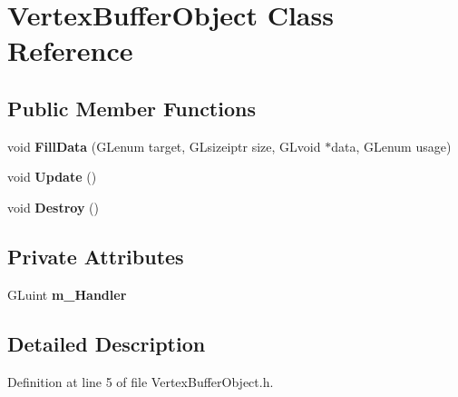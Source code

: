 \hypertarget{class_vertex_buffer_object}{}\section{Vertex\+Buffer\+Object Class Reference}
\label{class_vertex_buffer_object}
\subsection*{Public Member Functions}
\begin{DoxyCompactItemize}
\item 
void {\bfseries Fill\+Data} (G\+Lenum target, G\+Lsizeiptr size, G\+Lvoid $\ast$data, G\+Lenum usage)\hypertarget{class_vertex_buffer_object_a66d5483cb22e5634b9f6258be742887f}{}\label{class_vertex_buffer_object_a66d5483cb22e5634b9f6258be742887f}

\item 
void {\bfseries Update} ()\hypertarget{class_vertex_buffer_object_a959cfd1cceb22696a0b52bdafe9c9315}{}\label{class_vertex_buffer_object_a959cfd1cceb22696a0b52bdafe9c9315}

\item 
void {\bfseries Destroy} ()\hypertarget{class_vertex_buffer_object_a23fb19dcd2a9d7c1231f3bff6511354f}{}\label{class_vertex_buffer_object_a23fb19dcd2a9d7c1231f3bff6511354f}

\end{DoxyCompactItemize}
\subsection*{Private Attributes}
\begin{DoxyCompactItemize}
\item 
G\+Luint {\bfseries m\+\_\+\+Handler}\hypertarget{class_vertex_buffer_object_a66c6bdee758aff18f3869541136d6933}{}\label{class_vertex_buffer_object_a66c6bdee758aff18f3869541136d6933}

\end{DoxyCompactItemize}


\subsection{Detailed Description}


Definition at line 5 of file Vertex\+Buffer\+Object.\+h.

